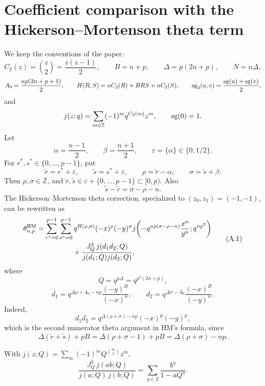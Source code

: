 \appendix
\section{Coefficient comparison with the Hickerson--Mortenson theta term}
\label{app:HM-coeff-comparison}

We keep the conventions of the paper:
\[
  C_2(z)=\binom z2=\frac{z(z-1)}2,\qquad
  B=n+p,\qquad
  \Delta=p(2n+p),\qquad
  N=n\Delta,
\]
\[
  A_0=\frac{np(2n+p+1)}2,\qquad
  H(R,S)=nC_2(R)+BRS+nC_2(S),\qquad
  \operatorname{sg}_2(u,v)=\frac{\operatorname{sg}(u)+\operatorname{sg}(v)}2,
\]
and
\[
  j(z;q)=\sum_{m\in\mathbb Z}(-1)^m q^{C_2(m)}z^m,\qquad
  \operatorname{sg}(0)=1.
\]
Let
\[
  \alpha=\frac{n-1}{2},\qquad \beta=\frac{n+1}{2},\qquad
  \varepsilon=\{\alpha\}\in\{0,1/2\}.
\]
For \(r^*,s^*\in\{0,\ldots,p-1\}\), put
\[
  \widetilde r=r^*+\varepsilon,\qquad
  \widetilde s=s^*+\varepsilon,\qquad
  \rho=\widetilde r-\alpha,\qquad
  \sigma=\widetilde s+\beta.
\]
Then \(\rho,\sigma\in\mathbb Z\), and
\(\widetilde r,\widetilde s\in \varepsilon+\{0,\ldots,p-1\}\subset[0,p)\).
Also
\[
  \widetilde s-\widetilde r=\sigma-\rho-n.
\]
The Hickerson--Mortenson theta correction, specialized to
\((z_0,z_1)=(-1,-1)\), can be rewritten as
\[
\begin{aligned}
\theta^{\rm HM}_{n,p}
=&\sum_{r^*=0}^{p-1}\sum_{s^*=0}^{p-1}
 q^{H(\rho,\sigma)}(-x)^\rho(-y)^\sigma
 j\!\left(-q^{np(\sigma-\rho-n)}\frac{x^n}{y^n};q^{np^2}\right) \\
&\qquad\qquad\times
 \frac{J_Q^3\,j(d_1d_2;Q)}{j(d_1;Q)j(d_2;Q)},
\end{aligned}
\tag{A.1}
\]
where
\[
  Q=q^{p\Delta}=q^{p^2(2n+p)},
\]
\[
  d_1=q^{\Delta\rho+A_0-np}\frac{(-y)^B}{(-x)^n},\qquad
  d_2=q^{\Delta\sigma-A_0}\frac{(-x)^B}{(-y)^n}.
\]
Indeed,
\[
  d_1d_2=q^{\Delta(\rho+\sigma)-np}(-x)^p(-y)^p,
\]
which is the second numerator theta argument in HM's formula, since
\[
  \Delta(\widetilde r+\widetilde s)+pB
  =\Delta(\rho+\sigma-1)+pB
  =\Delta(\rho+\sigma)-np.
\]

\begin{lemma}\label{lem:kronecker}
With $j(z;Q)=\sum_m(-1)^mQ^{\binom{m}{2}}z^m$,
\[
  \frac{J_Q^3\,j(ab;Q)}{j(a;Q)\,j(b;Q)}
  =\sum_{\eta\in\mathbb Z}\frac{b^\eta}{1-aQ^\eta}.
\tag{A.2}
\]
\end{lemma}

